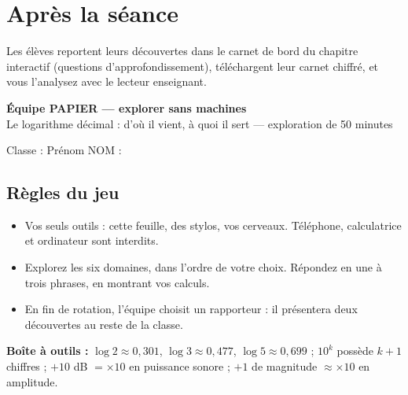 \documentclass[11pt,a4paper]{article}
\newcommand{\champ}[1]{\makebox[#1]{\dotfill}}
\begin{document}
\section*{Après la séance}
Les élèves reportent leurs découvertes dans le carnet de bord du chapitre interactif (questions d'approfondissement), téléchargent leur carnet chiffré, et vous l'analysez avec le lecteur enseignant.
\newpage
\begin{center}{\Large\bfseries Équipe PAPIER --- explorer sans machines}\\[4pt]{\small Le logarithme décimal : d'où il vient, à quoi il sert --- exploration de 50 minutes}\end{center}
{\small Classe : \champ{3.2cm}\hfill Prénom NOM : \champ{4.6cm}}
\subsection*{Règles du jeu}
\begin{itemize}[leftmargin=1.4em,itemsep=2pt]
\item Vos seuls outils : cette feuille, des stylos, vos cerveaux. Téléphone, calculatrice et ordinateur sont interdits.
\item Explorez les six domaines, dans l'ordre de votre choix. Répondez en une à trois phrases, en montrant vos calculs.
\item En fin de rotation, l'équipe choisit un rapporteur : il présentera deux découvertes au reste de la classe.
\end{itemize}
{\bfseries Boîte à outils :} $\log 2 \approx 0{,}301$, $\log 3 \approx 0{,}477$, $\log 5 \approx 0{,}699$ ; $10^{k}$ possède $k+1$ chiffres ; $+10$ dB $= \times 10$ en puissance sonore ; $+1$ de magnitude $\approx \times 10$ en amplitude.\par\medskip
\end{document}

